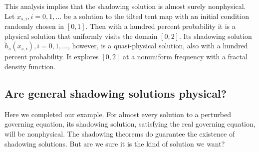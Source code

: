 This analysis implies that the shadowing solution is
almost surely nonphysical.  Let $x_{s,i},i=0,1,\ldots$ be a solution
to the tilted tent map with an initial condition randomly chosen
in $[0,1]$.  Then with a hundred percent probability
it is a physical solution that uniformly visits the domain $[0,2]$.
Its shadowing solution $\tilde{h}_s(x_{s,i}),i=0,1,\ldots$, however,
is a quasi-physical solution, also with a hundred percent probability.
It explores $[0,2]$ at a nonuniform frequency with a fractal density function.

\subsection{Are general shadowing solutions physical?}

Here we completed our example.  For almost every solution to a perturbed governing
equation, its shadowing solution, satisfying the real governing equation, will
be nonphysical.  The shadowing theorems do guarantee the existence of shadowing
solutions.  But are we sure it is the kind of solution we want?

